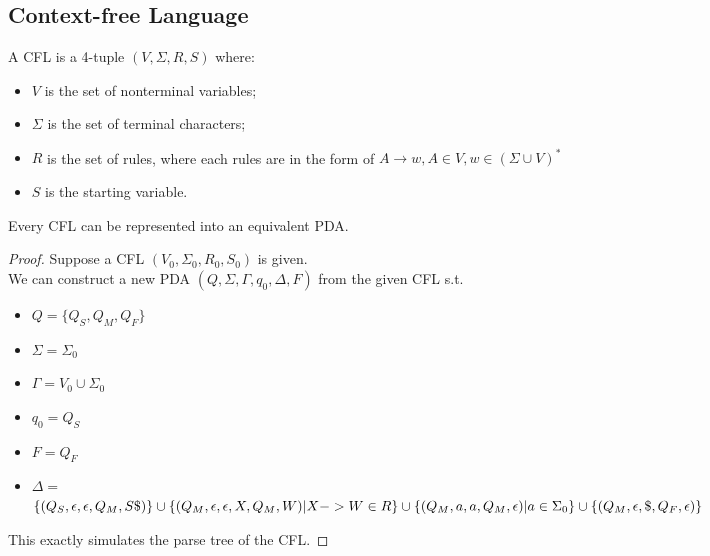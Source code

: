 \documentclass{report}
\begin{document}
		\subsection{Context-free Language}
			\begin{defn}
				A CFL is a 4-tuple $(V,\Sigma,R,S)$ where:
				\begin{itemize}
					\item $V$ is the set of nonterminal variables;
					\item $\Sigma$ is the set of terminal characters;
					\item $R$ is the set of rules, where each rules are in the form of $A\rightarrow w, A\in V, w\in (\Sigma \cup V)^*$
					\item $S$ is the starting variable.
				\end{itemize}
			\end{defn}
			\begin{thm}
				Every CFL can be represented into an equivalent PDA.
			\end{thm}
			\begin{proof}
				Suppose a CFL $(V_0,\Sigma_0,R_0,S_0)$ is given.\\
				We can construct a new PDA $(Q,\Sigma,\Gamma,q_0,\Delta,F)$ from the given CFL s.t.
				\begin{itemize}
					\item $Q=\{Q_S,Q_M,Q_F\}$
					\item $\Sigma=\Sigma_0$
					\item $\Gamma=V_0 \cup \Sigma_0$
					\item $q_0=Q_S$
					\item $F=Q_F$
					\item $\Delta=$\\
					\begin{math}
					\{(Q_S,\epsilon,\epsilon,Q_M,S\$)\}\cup\\
					\{(Q_M,\epsilon,\epsilon,X,Q_M,W)|X->W \in R\}\cup\\
					\{(Q_M,a,a,Q_M,\epsilon)|a \in \Sigma_0\}\cup\\
					\{(Q_M,\epsilon,\$,Q_F,\epsilon)\}
					\end{math}
				\end{itemize}
				This exactly simulates the parse tree of the CFL.
			\end{proof}
	
\end{document}
